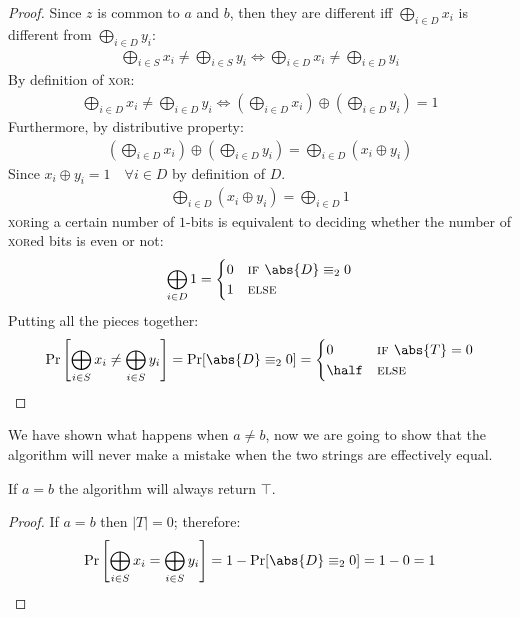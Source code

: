 \begin{proof}
    Since $z$ is common to $a$ and $b$, then they are different iff $\bigoplus_{i \in D} x_i$ is different from $\bigoplus_{i \in D} y_i$:
    \begin{align}
        \bigoplus_{i \in S} x_i \neq \bigoplus_{i \in S} y_i \iff \bigoplus_{i \in D} x_i \neq \bigoplus_{i \in D} y_i 
    \end{align}
    By definition of \textsc{xor}:
    \begin{align}
        \bigoplus_{i \in D} x_i \neq \bigoplus_{i \in D} y_i \iff \left(\bigoplus_{i \in D} x_i\right) \oplus \left(\bigoplus_{i \in D} y_i\right) = 1
    \end{align}
    Furthermore, by distributive property:
    \begin{align}
        \left(\bigoplus_{i \in D} x_i\right) \oplus \left(\bigoplus_{i \in D} y_i\right) = \bigoplus_{i \in D}\left( x_i \oplus y_i \right)
    \end{align}
    Since $x_i \oplus y_i = 1 \quad \forall i \in D$ by definition of $D$.
    \begin{align}
        \bigoplus_{i \in D}( x_i \oplus y_i ) = \bigoplus_{i \in D} 1
    \end{align}
    \textsc{xor}ing a certain number of $1$-bits is equivalent to deciding whether the number of \textsc{xor}ed bits is even or not:
    \begin{align}
        \bigoplus_{i \in D} 1 = 
        \begin{cases}
            0 & \textsc{if } \abs{D} \equiv_2 0 \\
            1 & \textsc{else}
        \end{cases}
    \end{align}
    Putting all the pieces together:
    \begin{align}
        \Pr \left[ \bigoplus_{i \in S} x_i \neq \bigoplus_{i \in S} y_i \right] = \Pr[\abs{D} \equiv_2 0] = 
        \begin{cases}
            0 & \textsc{if } \abs{T} = 0 \\
            \half & \textsc{else}
        \end{cases}
    \end{align}
\end{proof}

We have shown what happens when $a \neq b$, now we are going to show that the algorithm will never make a mistake when the two strings are effectively equal.

\begin{claim}
    If $a = b$ the algorithm will always return $\top$.
\end{claim}
\begin{proof}
    If $a = b$ then $|T| = 0$; therefore:
    \[
        \Pr \left[ \bigoplus_{i \in S} x_i = \bigoplus_{i \in S} y_i \right] = 1 - \Pr[\abs{D} \equiv_2 0] = 1 - 0 = 1
    \] 
\end{proof}
    

